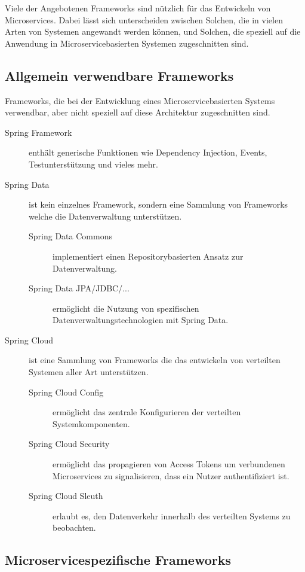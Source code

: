 \documentclass{article}
\begin{document}
Viele der Angebotenen Frameworks sind nützlich für das Entwickeln von Microservices.
Dabei lässt sich unterscheiden zwischen Solchen, die in vielen Arten von Systemen angewandt werden können, und Solchen, die speziell auf die Anwendung in Microservicebasierten Systemen zugeschnitten sind.

\subsection{Allgemein verwendbare Frameworks}

Frameworks, die bei der Entwicklung eines Microservicebasierten Systems verwendbar, aber nicht speziell auf diese Architektur zugeschnitten sind.

\begin{description}
    \item[Spring Framework] enthält generische Funktionen wie Dependency Injection, Events, Testunterstützung und vieles mehr.
    \item[Spring Data] ist kein einzelnes Framework, sondern eine Sammlung von Frameworks welche die Datenverwaltung unterstützen.
    \begin{description}
        \item[Spring Data Commons] implementiert einen Repositorybasierten Ansatz zur Datenverwaltung.
        \item[Spring Data JPA/JDBC/...] ermöglicht die Nutzung von spezifischen Datenverwaltungstechnologien mit Spring Data.
    \end{description}

    \item[Spring Cloud] ist eine Sammlung von Frameworks die das entwickeln von verteilten Systemen aller Art unterstützen.
    \begin{description}
        \item[Spring Cloud Config] ermöglicht das zentrale Konfigurieren der verteilten Systemkomponenten.
        \item[Spring Cloud Security] ermöglicht das propagieren von Access Tokens um verbundenen Microservices zu signalisieren, dass ein Nutzer authentifiziert ist.
        \item[Spring Cloud Sleuth] erlaubt es, den Datenverkehr innerhalb des verteilten Systems zu beobachten.
    \end{description}
\end{description}

\subsection{Microservicespezifische Frameworks}
\end{document}
